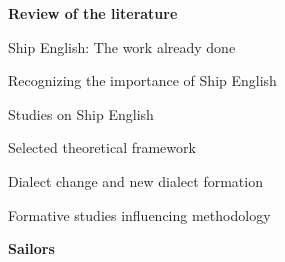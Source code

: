 \setcounter{listWWNumiileveli}{0}
\begin{listWWNumiileveli}
\item 
\begin{styleNormali}
\textbf{Review of the literature }
\end{styleNormali}
\end{listWWNumiileveli}

\setcounter{listWWNumivleveli}{1}
\begin{listWWNumivleveli}
\item 

\setcounter{listWWNumivlevelii}{0}
\begin{listWWNumivlevelii}
\item 
\begin{styleNormali}
Ship English: The work already done
\end{styleNormali}


\setcounter{listWWNumivleveliii}{0}
\begin{listWWNumivleveliii}
\item 
\begin{styleNormali}
Recognizing the importance of Ship English 
\end{styleNormali}
\item 
\begin{styleNormali}
Studies on Ship English
\end{styleNormali}
\end{listWWNumivleveliii}
\item 
\begin{styleNormali}
Selected theoretical framework 
\end{styleNormali}


\setcounter{listWWNumivleveliii}{0}
\begin{listWWNumivleveliii}
\item 
\begin{styleNormali}
Dialect change and new dialect formation 
\end{styleNormali}
\item 
\begin{styleNormali}
Formative studies influencing methodology
\end{styleNormali}
\end{listWWNumivleveliii}
\end{listWWNumivlevelii}
\end{listWWNumivleveli}

\setcounter{listWWNumiileveli}{0}
\begin{listWWNumiileveli}
\item 
\begin{styleNormali}
\textbf{Sailors }
\end{styleNormali}
\end{listWWNumiileveli}

